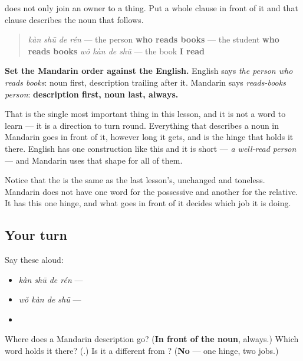\begin{grammarlens}[title={Grammar Lens: put the description in front}]
 does not only join an owner to a thing. Put a whole clause in front of it and that clause describes the noun that follows.

\begin{quote}
\textbf{} \emph{kàn shū de rén} — the person \textbf{who reads books} \textbf{} — the student \textbf{who reads books} \textbf{} \emph{wǒ kàn de shū} — the book \textbf{I read}
\end{quote}

\textbf{Set the Mandarin order against the English.} English says \emph{the person who reads books}: noun first, description trailing after it. Mandarin says \emph{reads-books  person}: \textbf{description first, noun last, always.}

That is the single most important thing in this lesson, and it is not a word to learn — it is a direction to turn round. Everything that describes a noun in Mandarin goes in front of it, however long it gets, and  is the hinge that holds it there. English has one construction like this and it is short — \emph{a well-read person} — and Mandarin uses that shape for all of them.

Notice that the  is the same  as the last lesson's, unchanged and toneless. Mandarin does not have one word for the possessive and another for the relative. It has this one hinge, and what goes in front of it decides which job it is doing.
\end{grammarlens}

\subsection*{Your turn}
Say these aloud:

\begin{itemize}
\raggedright
  \item \emph{kàn shū de rén} — 
  \item \emph{wǒ kàn de shū} — 
  \item {}
\end{itemize}

\begin{tcolorbox}[breakable,colback=teal!4,colframe=teal!35!black,title={Before you move on}]
Where does a Mandarin description go? (\textbf{In front of the noun}, always.) Which word holds it there? (\textbf{}.) Is it a different  from ? (\textbf{No} — one hinge, two jobs.)
\end{tcolorbox}
